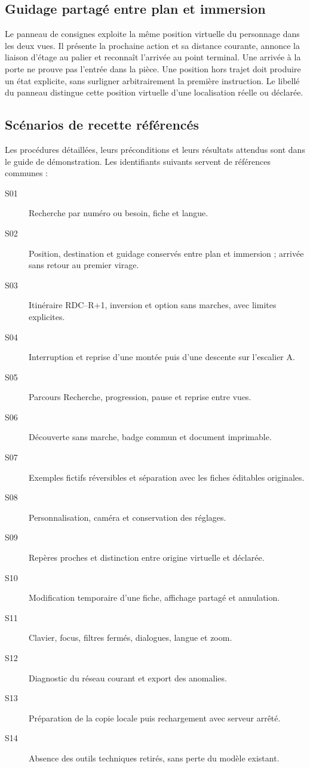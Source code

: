 \documentclass[11pt,a4paper]{article}
\begin{document}
\subsection{Guidage partagé entre plan et immersion}
Le panneau de consignes exploite la même position virtuelle du personnage dans les deux vues. Il présente la prochaine action et sa distance courante, annonce la liaison d'étage au palier et reconnaît l'arrivée au point terminal. Une arrivée à la porte ne prouve pas l'entrée dans la pièce. Une position hors trajet doit produire un état explicite, sans surligner arbitrairement la première instruction. Le libellé du panneau distingue cette position virtuelle d'une localisation réelle ou déclarée.

\subsection{Scénarios de recette référencés}
Les procédures détaillées, leurs préconditions et leurs résultats attendus sont dans le guide de démonstration. Les identifiants suivants servent de références communes :
\begin{description}
\item[S01] Recherche par numéro ou besoin, fiche et langue.
\item[S02] Position, destination et guidage conservés entre plan et immersion ; arrivée sans retour au premier virage.
\item[S03] Itinéraire RDC--R+1, inversion et option sans marches, avec limites explicites.
\item[S04] Interruption et reprise d'une montée puis d'une descente sur l'escalier A.
\item[S05] Parcours Recherche, progression, pause et reprise entre vues.
\item[S06] Découverte sans marche, badge commun et document imprimable.
\item[S07] Exemples fictifs réversibles et séparation avec les fiches éditables originales.
\item[S08] Personnalisation, caméra et conservation des réglages.
\item[S09] Repères proches et distinction entre origine virtuelle et déclarée.
\item[S10] Modification temporaire d'une fiche, affichage partagé et annulation.
\item[S11] Clavier, focus, filtres fermés, dialogues, langue et zoom.
\item[S12] Diagnostic du réseau courant et export des anomalies.
\item[S13] Préparation de la copie locale puis rechargement avec serveur arrêté.
\item[S14] Absence des outils techniques retirés, sans perte du modèle existant.
\end{description}
\end{document}
